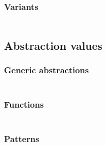 \subsubsection{Variants}\hypertarget{variants}{}\label{variants}

\begin{align*}
  [ \
  \KEY{Datatype} \quad & \NAMEHYPER{../../../../../Funcons-beta/Values/Composite}{Variants}{variants} \\
  \KEY{Funcon} \quad & \NAMEHYPER{../../../../../Funcons-beta/Values/Composite}{Variants}{variant}
  \ ]
\end{align*}
\subsection{Abstraction values}\hypertarget{abstraction-values}{}\label{abstraction-values}

\subsubsection{Generic abstractions}\hypertarget{generic-abstractions}{}\label{generic-abstractions}

\begin{align*}
  [ \
  \KEY{Funcon} \quad & \NAMEHYPER{../../../../../Funcons-beta/Values/Abstraction}{Generic}{abstraction} \\
  \KEY{Funcon} \quad & \NAMEHYPER{../../../../../Funcons-beta/Values/Abstraction}{Generic}{closure}
  \ ]
\end{align*}
\subsubsection{Functions}\hypertarget{functions}{}\label{functions}

\begin{align*}
  [ \
  \KEY{Datatype} \quad & \NAMEHYPER{../../../../../Funcons-beta/Values/Abstraction}{Functions}{functions} \\
  \KEY{Funcon} \quad & \NAMEHYPER{../../../../../Funcons-beta/Values/Abstraction}{Functions}{function} \\
  \KEY{Funcon} \quad & \NAMEHYPER{../../../../../Funcons-beta/Values/Abstraction}{Functions}{apply} \\
  \KEY{Funcon} \quad & \NAMEHYPER{../../../../../Funcons-beta/Values/Abstraction}{Functions}{curry}
  \ ]
\end{align*}
\subsubsection{Patterns}\hypertarget{patterns}{}\label{patterns}


